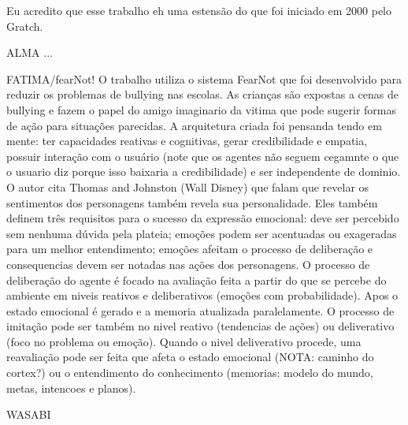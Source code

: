 Eu acredito que esse trabalho eh uma estensão do que foi iniciado em 2000 pelo
Gratch.

{ALMA} %
...

{FATIMA/fearNot!}
\cite{dias2005feeling}
O trabalho utiliza o sistema FearNot que foi desenvolvido para reduzir os
problemas de bullying nas escolas. As crianças são expostas a cenas de
bullying e fazem o papel do amigo imaginario da vitima que pode sugerir formas
de ação para situações parecidas. A arquitetura criada foi pensanda tendo em
mente: ter capacidades reativas e cognitivas, gerar credibilidade e empatia,
possuir interação com o usuário (note que os agentes não seguem cegamnte o que
o usuario diz porque isso baixaria a credibilidade) e ser independente de
dominio.
%
O autor cita Thomas and Johnston (Wall Disney) que falam que revelar os
sentimentos dos personagens também revela sua personalidade. Eles também
definem três requisitos para o sucesso da expressão emocional: deve ser
percebido sem nenhuma dúvida pela plateia; emoções podem ser acentuadas ou
exageradas para um melhor entendimento;  emoções afeitam o processo de
deliberação e consequencias devem ser notadas nas ações dos personagens.
%
O processo de deliberação do agente é focado na avaliação feita a partir do
que se percebe do ambiente em niveis reativos e deliberativos (emoções com
probabilidade). Apos o estado emocional é gerado e a memoria atualizada
paralelamente. O processo de imitação pode ser também no nivel reativo
(tendencias de ações) ou deliverativo (foco no problema ou emoção). Quando o
nivel deliverativo procede, uma reavaliação pode ser feita que afeta o estado
emocional (NOTA: caminho do cortex?) ou o entendimento do conhecimento
(memorias: modelo do mundo, metas, intencoes e planos).

{WASABI} %



\cite{grimaldo2006ontology}
\cite{kshirsagar2002multilayer}
